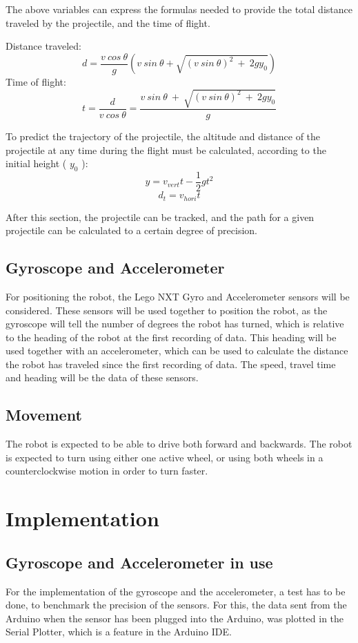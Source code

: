 The above variables can express the formulas needed to provide the total distance traveled by the projectile, and the time of flight.\newline

Distance traveled:
\[d = \dfrac{v \ cos \ \theta}{g}(v \ sin \ \theta + \sqrt{(v \ sin \ \theta)^2 \ + \ 2gy_{0}})\] \newline
Time of flight:
\[t = \dfrac{d}{v \ cos \ \theta} = \dfrac{v \ sin \ \theta \ + \ \sqrt{(v \ sin \ \theta)^2 \ + \ 2gy_{0}}}{g}\]
\newline

To predict the trajectory of the projectile, the altitude and distance of the projectile at any time during the flight must be calculated, according to the initial height ( \(y_{0}\) ):
\[y = v_{vert}t - \dfrac{1}{2} gt^2\]
\[d_{t} = v_{hori}t\]

After this section, the projectile can be tracked, and the path for a given projectile can be calculated to a certain degree of precision. 

\subsection{Gyroscope and Accelerometer}
\label{sec:i1Gyroscope and Accelerometer}
For positioning the robot, the Lego NXT Gyro and Accelerometer sensors will be considered. These sensors will be used together to position the robot, as the gyroscope will tell the number of degrees the robot has turned, which is relative to the heading of the robot at the first recording of data. This heading will be used together with an accelerometer, which can be used to calculate the distance the robot has traveled since the first recording of data. The speed, travel time and heading will be the data of these sensors.


\subsection{Movement}
\label{sec:i1Movement}
The robot is expected to be able to drive both forward and backwards. The robot is expected to turn using either one active wheel, or using both wheels in a counterclockwise motion in order to turn faster.


\section{Implementation}
\label{sec:i1Implementation}

\subsection{Gyroscope and Accelerometer in use}
\label{sec:i1Gyroscope and Accelerometer in use}
For the implementation of the gyroscope and the accelerometer, a test has to be done, to benchmark the precision of the sensors. For this, the data sent from the Arduino when the sensor has been plugged into the Arduino, was plotted in the Serial Plotter, which is a feature in the Arduino IDE. 

